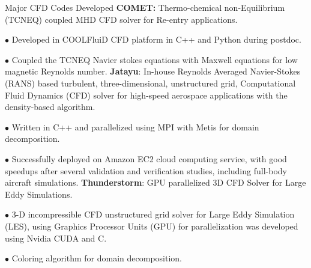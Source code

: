 \begin{rubric}{Major CFD Codes Developed}
\entry*[2020 -- present]%
	\textbf{COMET:} Thermo-chemical non-Equilibrium (TCNEQ) coupled MHD CFD solver for Re-entry applications. \par
	{$\bullet$} Developed in COOLFluiD CFD platform in C++ and Python during postdoc. \par
    {$\bullet$} Coupled the TCNEQ Navier stokes equations with Maxwell equations for low magnetic Reynolds number. %
\entry*[2014 -- 2020]%
	\textbf{Jatayu}: In-house Reynolds Averaged Navier-Stokes (RANS) based turbulent, three-dimensional, unstructured grid, Computational Fluid Dynamics (CFD) solver for high-speed aerospace applications with the density-based algorithm. \par
    {$\bullet$} Written in C++ and parallelized using MPI with Metis for domain decomposition. \par 
    {$\bullet$} Successfully deployed on Amazon EC2 cloud computing service, with good speedups after several validation and verification studies, including full-body aircraft simulations. %
\entry*[2013 -- 2014]%
	\textbf{Thunderstorm}: GPU parallelized 3D CFD Solver for Large Eddy Simulations. \par
	{$\bullet$} 3-D incompressible CFD unstructured grid solver for Large Eddy Simulation (LES), using Graphics Processor Units (GPU) for parallelization was developed using Nvidia CUDA and C. \par
    {$\bullet$} Coloring algorithm for domain decomposition. %
\end{rubric}